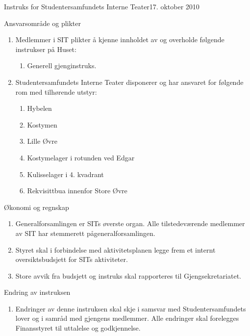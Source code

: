\begin{instruks}{Instruks for Studentersamfundets Interne Teater}{17. oktober 2010}{ }
	\begin{instruksledd}{Ansvarsområde og plikter}
		\begin{enumerate}   
			\item  Medlemmer i SIT plikter å kjenne innholdet av og overholde følgende instrukser på
				Huset:
				\begin{enumerate}
					\item Generell gjenginstruks.
				\end{enumerate}
			\item Studentersamfundets Interne Teater disponerer og har ansvaret for følgende rom med
				tilhørende utstyr:
				\begin{enumerate}
					\item Hybelen
					\item Kostymen
					\item Lille Øvre
					\item Kostymelager i rotunden ved Edgar
					\item Kulisselager i 4. kvadrant
					\item Rekvisittbua innenfor Store Øvre
				\end{enumerate}
		\end{enumerate}
	\end{instruksledd}

	\begin{instruksledd}{Økonomi og regnskap}
		\begin{enumerate}
			\item Generalforsamlingen er SITs øverste organ. Alle tilstedeværende
				medlemmer av SIT har stemmerett pågeneralforsamlingen. 
			\item Styret skal i forbindelse med aktivitetsplanen legge frem et
				internt oversiktsbudsjett for SITs aktiviteter.
			\item Store avvik fra budsjett og instruks skal rapporteres til
				Gjengsekretariatet.
		\end{enumerate}  
	\end{instruksledd}


	\begin{instruksledd}{Endring av instruksen}
		\begin{enumerate}
			\item Endringer av denne instruksen skal skje i samsvar med
				Studentersamfundets lover og i samråd med gjengens medlemmer. Alle endringer skal forelegges
				Finansstyret til uttalelse og godkjennelse.		
		\end{enumerate}  
	\end{instruksledd}


\end{instruks}
